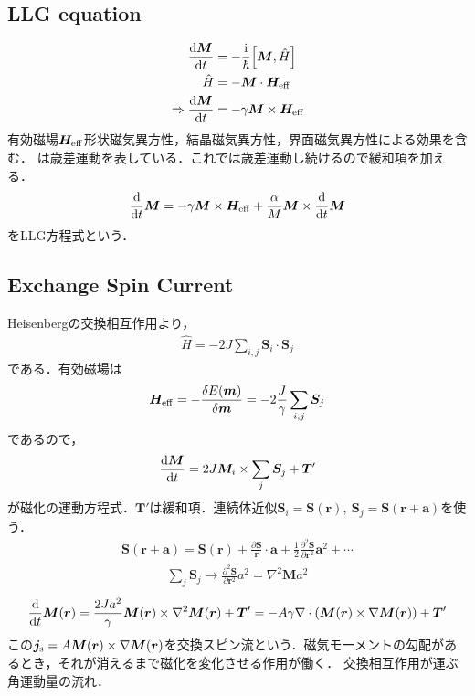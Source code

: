 \documentclass{ltjarticle}
\begin{document}
\subsection{LLG equation}
\begin{align}
  \dv{\bm{M}}{t} &= -\frac{\mathrm{i}}{\hbar}\qty[\bm{M},\hat{H}]\\
  \hat{H} &= -\bm{M}\cdot\bm{H}_{\mathrm{eff}}\\
  \Rightarrow \dv{\bm{M}}{t} &= -\gamma \bm{M}\times\bm{H}_{\mathrm{eff}} \label{landau-eq}
\end{align}
有効磁場$\bm{H}_{\mathrm{eff}}$形状磁気異方性，結晶磁気異方性，界面磁気異方性による効果を含む．
は歳差運動を表している．これでは歳差運動し続けるので緩和項を加える．
\begin{align}
  \frac{\mathrm{d}}{\dd{t}}\bm{M} = -\gamma \bm{M}\times \bm{H}_{\mathrm{eff}} + \frac{\alpha}{M}\bm{M}\times \frac{\mathrm{d}}{\dd{t}}\bm{M} \label{LLG-eq}
\end{align}
をLLG方程式という．
\subsection{Exchange Spin Current}
Heisenbergの交換相互作用より，
\begin{align}
  \hat{H} = -2J\sum_{i,j} \bm{S}_i \cdot \bm{S}_j
\end{align}
である．有効磁場は
\begin{align}
  \bm{H}_{\mathrm{eff}} = -\frac{\delta E(\bm{m})}{\delta\bm{m}} = -2\frac{J}{\gamma}\sum_{i,j} \bm{S}_j
\end{align}
であるので，
\begin{align}
  \dv{\bm{M}}{t} = 2J\bm{M}_i \times \sum_{j} \bm{S}_j + \bm{T}'
\end{align}
が磁化の運動方程式．$\bm{T}'$は緩和項．連続体近似$\bm{S}_i = \bm{S}(\bm{r}),\ \bm{S}_j = \bm{S}(\bm{r+a})$を使う．
\begin{align}
  \bm{S}(\bm{r}+\bm{a}) = \bm{S}(\bm{r}) + \frac{\partial\bm{S}}{\bm{r}}\cdot\bm{a} + \frac{1}{2}\frac{\partial^2\bm{S}}{\partial\bm{r}^2}\bm{a}^2 + \cdots
\end{align}
\begin{align}
  \sum_{j} \bm{S}_j \to \frac{\partial^2 \bm{S}}{\partial \bm{r}^2} a^2 = \nabla^2 \bm{M}a^2
\end{align}
\begin{align}
  \frac{\mathrm{d}}{\dd{t}}\bm{M}(\bm{r}) = \frac{2Ja^2}{\gamma}\bm{M}(\bm{r})\times\nabla^2\bm{M}(\bm{r}) + \bm{T}' = -A\gamma\nabla\cdot(\bm{M}(\bm{r})\times\nabla\bm{M}(\bm{r})) + \bm{T}'
\end{align}
この$\bm{j}_{\mathrm{s}} = A\bm{M}(\bm{r})\times\nabla\bm{M}(\bm{r})$を交換スピン流という．磁気モーメントの勾配があるとき，それが消えるまで磁化を変化させる作用が働く．
交換相互作用が運ぶ角運動量の流れ．
\end{document}

